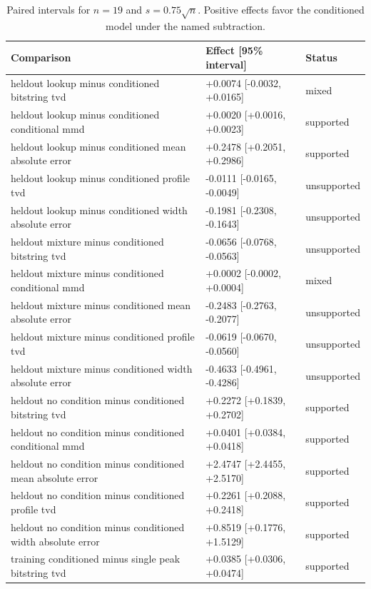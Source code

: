 \begin{table}[p]
\centering
\scriptsize
\setlength{\tabcolsep}{4pt}
\caption{Paired intervals for $n=19$ and $s=0.75\sqrt n$. Positive effects favor the conditioned model under the named subtraction.}
\label{tab:all-intervals-n19-w0.75}
\begin{tabular}{@{}p{}p{}p{}@{}}
\toprule
Comparison & Effect [95\% interval] & Status\\
\midrule
heldout lookup minus conditioned bitstring tvd & +0.0074 [-0.0032, +0.0165] & mixed \\
heldout lookup minus conditioned conditional mmd & +0.0020 [+0.0016, +0.0023] & supported \\
heldout lookup minus conditioned mean absolute error & +0.2478 [+0.2051, +0.2986] & supported \\
heldout lookup minus conditioned profile tvd & -0.0111 [-0.0165, -0.0049] & unsupported \\
heldout lookup minus conditioned width absolute error & -0.1981 [-0.2308, -0.1643] & unsupported \\
heldout mixture minus conditioned bitstring tvd & -0.0656 [-0.0768, -0.0563] & unsupported \\
heldout mixture minus conditioned conditional mmd & +0.0002 [-0.0002, +0.0004] & mixed \\
heldout mixture minus conditioned mean absolute error & -0.2483 [-0.2763, -0.2077] & unsupported \\
heldout mixture minus conditioned profile tvd & -0.0619 [-0.0670, -0.0560] & unsupported \\
heldout mixture minus conditioned width absolute error & -0.4633 [-0.4961, -0.4286] & unsupported \\
heldout no condition minus conditioned bitstring tvd & +0.2272 [+0.1839, +0.2702] & supported \\
heldout no condition minus conditioned conditional mmd & +0.0401 [+0.0384, +0.0418] & supported \\
heldout no condition minus conditioned mean absolute error & +2.4747 [+2.4455, +2.5170] & supported \\
heldout no condition minus conditioned profile tvd & +0.2261 [+0.2088, +0.2418] & supported \\
heldout no condition minus conditioned width absolute error & +0.8519 [+0.1776, +1.5129] & supported \\
training conditioned minus single peak bitstring tvd & +0.0385 [+0.0306, +0.0474] & supported \\

\end{tabular}
\end{table}
